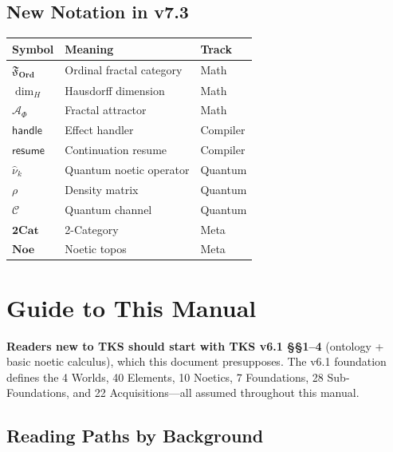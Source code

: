 \documentclass[11pt,twoside,openright]{book}
\theoremstyle{definition}
\theoremstyle{plain}
\theoremstyle{remark}
\newcommand{\Ord}{\mathbf{Ord}}              %
\newcommand{\OrdFrac}{\mathfrak{F}_{\Ord}}           %
\newcommand{\HausdorffDim}{\dim_H}                   %
\newcommand{\FractalAttractor}{\mathcal{A}_\Phi}     %
\newcommand{\EffHandler}{\mathsf{handle}}            %
\newcommand{\Resume}{\mathsf{resume}}                %
\newcommand{\NoeticOp}[1]{\hat{\nu}_{#1}}            %
\newcommand{\DensityMat}{\rho}                       %
\newcommand{\QuantumChannel}{\mathcal{C}}            %
\newcommand{\TwoCat}{\mathbf{2Cat}}                  %
\newcommand{\NoeticTopos}{\mathbf{Noe}}              %
\begin{document}
\section*{New Notation in v7.3}

\begin{center}
\begin{tabular}{lll}
\toprule
\textbf{Symbol} & \textbf{Meaning} & \textbf{Track} \\
\midrule
$\OrdFrac$ & Ordinal fractal category & Math \\
$\HausdorffDim$ & Hausdorff dimension & Math \\
$\FractalAttractor$ & Fractal attractor & Math \\
$\EffHandler$ & Effect handler & Compiler \\
$\Resume$ & Continuation resume & Compiler \\
$\NoeticOp{k}$ & Quantum noetic operator & Quantum \\
$\DensityMat$ & Density matrix & Quantum \\
$\QuantumChannel$ & Quantum channel & Quantum \\
$\TwoCat$ & 2-Category & Meta \\
$\NoeticTopos$ & Noetic topos & Meta \\
\bottomrule
\end{tabular}
\end{center}

\tableofcontents


\chapter*{Guide to This Manual}

\begin{tcolorbox}[colback=blue!5!white,colframe=blue!75!black,title=\textbf{Prerequisites}]
\textbf{Readers new to TKS should start with TKS v6.1 \S\S1--4} (ontology + basic noetic calculus), which this document presupposes. The v6.1 foundation defines the 4 Worlds, 40 Elements, 10 Noetics, 7 Foundations, 28 Sub-Foundations, and 22 Acquisitions---all assumed throughout this manual.
\end{tcolorbox}

\section*{Reading Paths by Background}
\end{document}
